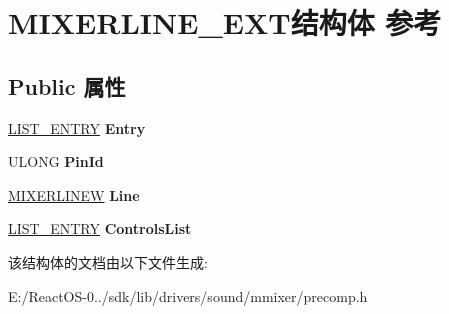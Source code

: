 \hypertarget{struct_m_i_x_e_r_l_i_n_e___e_x_t}{}\section{M\+I\+X\+E\+R\+L\+I\+N\+E\+\_\+\+E\+X\+T结构体 参考}
\label{struct_m_i_x_e_r_l_i_n_e___e_x_t}
\subsection*{Public 属性}
\begin{DoxyCompactItemize}
\item 
\mbox{\label{struct_m_i_x_e_r_l_i_n_e___e_x_t_a99255636c43cf13809ca35079b48205c}} 
\hyperlink{struct___l_i_s_t___e_n_t_r_y}{L\+I\+S\+T\+\_\+\+E\+N\+T\+RY} {\bfseries Entry}
\item 
\mbox{\label{struct_m_i_x_e_r_l_i_n_e___e_x_t_aee9ddcd873ecdb21f1d3e3f0d1a9f2ff}} 
U\+L\+O\+NG {\bfseries Pin\+Id}
\item 
\mbox{\label{struct_m_i_x_e_r_l_i_n_e___e_x_t_a3025da13a8e8be75ee5925a9d931176f}} 
\hyperlink{structtag_m_i_x_e_r_l_i_n_e_w}{M\+I\+X\+E\+R\+L\+I\+N\+EW} {\bfseries Line}
\item 
\mbox{\label{struct_m_i_x_e_r_l_i_n_e___e_x_t_aa8aae2642b7c66588a5cb410b44e223c}} 
\hyperlink{struct___l_i_s_t___e_n_t_r_y}{L\+I\+S\+T\+\_\+\+E\+N\+T\+RY} {\bfseries Controls\+List}
\end{DoxyCompactItemize}


该结构体的文档由以下文件生成\+:\begin{DoxyCompactItemize}
\item 
E\+:/\+React\+O\+S-\/0../sdk/lib/drivers/sound/mmixer/precomp.\+h\end{DoxyCompactItemize}
